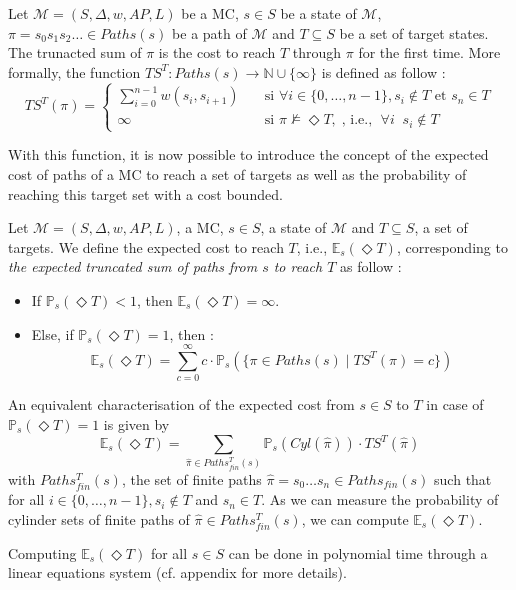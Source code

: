 \begin{definition}
  Let $\mathcal{M}=(S, \Delta, w, AP, L)$ be a MC, $s \in S$ be a state of $\mathcal{M}$, $\pi = s_0s_1s_2\dots \in Paths(s)$ be a path of $\mathcal{M}$ and $T \subseteq S$ be a set of target states.
  The trunacted sum of $\pi$ is the cost to reach $T$ through $\pi$
  for the first time. More formally, the function $TS^T : Paths(s) \rightarrow \mathbb{N} \cup \{\infty\}$ is defined as follow :
	\[
		TS^T(\pi) =
		\begin{cases}
			\sum_{i = 0}^{n-1} w(s_i, s_{i+1}) & \quad \text{si } \forall i \in \{0, \dots, n - 1\}, s_i \not\in T \text{ et } s_n \in T \\
			\infty & \quad \text{si } \pi \not \models \Diamond T,\; \text{, i.e., } \; \forall i \;\; s_i \notin T
		\end{cases}
	\]
\end{definition}
With this function, it is now possible to introduce the concept of the
expected cost of paths of a MC to reach a set of targets as well as
the probability of reaching this target set with a cost bounded.

\begin{definition}
	Let $\mathcal{M} = (S, \Delta, w, AP, L)$, a MC, $s \in S$, a state of $\mathcal{M}$ and $T \subseteq S$, a set of targets. We define the expected cost to reach $T$, i.e., $\mathbb{E}_s(\Diamond T)$, corresponding to \textit{the expected truncated sum of paths from $s$ to reach $T$} as follow :
	\begin{itemize}
	\renewcommand{\labelitemi}{\tiny$\bullet$}
	\item If $\mathbb{P}_s(\Diamond T) < 1$, then $\mathbb{E}_s(\Diamond T) = \infty$.%
	\item Else, if $\mathbb{P}_s(\Diamond T) = 1$, then :
	\[
    \mathbb{E}_s(\Diamond T) = \sum_{c = 0}^\infty c \cdot \mathbb{P}_s(\{\pi \in Paths(s) \; | \; TS^T(\pi) = c \})
  \]
	\end{itemize}
\end{definition}

An equivalent characterisation of the expected cost from $s \in S$ to $T$ in case of $\mathbb{P}_s(\Diamond T) = 1$ is given by
\[
  \mathbb{E}_s(\Diamond T) = \sum_{\hat{\pi} \in Paths_{fin}^T(s)} \mathbb{P}_s(Cyl(\hat{\pi})) \cdot TS^T(\hat{\pi})
\]
with $Paths^T_{fin}(s)$, the set of finite paths $\hat{\pi} = s_0 \dots s_n \in Paths_{fin}(s)$  such that for all $i \in \{0, \dots, n-1\}, s_i \not \in T$ and $s_n \in T$. As we can measure the probability of cylinder sets of finite paths of $\hat{\pi} \in Paths_{fin}^T(s)$, we can compute $\mathbb{E}_s(\Diamond T)$.

\begin{theorem}
  Computing $\mathbb{E}_s(\Diamond T)$ for all $s \in S$ can be done in polynomial time through a linear equations system (cf. appendix for more details).
\end{theorem}
